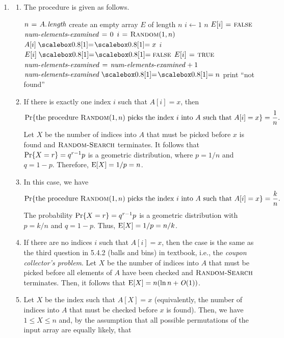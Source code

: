\begin{enumerate}[\thechapter-1]
\begin{enumerate}[\it a.]
\end{enumerate}
%
\item
\begin{enumerate}[\it a.]
\item The procedure is given as follows.
\begin{codebox}
\li $n \gets \attrib{A}{length}$
\li create an empty array $E$ of length $n$
\li \For $i \gets 1$ \To $n$
\li \Do
        $E[i] \mathrel{\hspace{1pt}=\hspace{1pt}} \textnormal{\scshape false}$
    \End
\li $\id{num-elements-examined} \gets 0$
\li \Repeat
\li      $i \mathrel{\hspace{1pt}=\hspace{1pt}} \textnormal{\scshape Random}(1, n)$
\li      \If $A[i] \isequal x$
\li          \Then
                   \Return $i$
\li          \Else
                   \If $E[i] \isequal \const{false}$
\li                    \Then
                             $E[i] \mathrel{\hspace{1pt}=\hspace{1pt}} \textnormal{\scshape true}$
\li                          $\id{num-elements-examined} \gets \id{num-elements-examined} + 1$
                       \End
             \End
\li \Until $\id{num-elements-examined} \isequal n$
\li print ``not found''
\end{codebox}
\item If there is exactly one index $i$ such that $A[i] = x$, then
\[
\pr{\mathtext{the procedure \mathmode{\proc{Random}(1, n)} picks the index \mathmode{i} into \mathmode{A} such that \mathmode{A[i] = x}}} = \frac{1}{n}.
\]
Let $X$ be the number of indices into $A$ that must be picked before $x$ is found and $\textnormal{\scshape Random-Search}$ terminates. It follows that $\Pr\!\left\{X = r\right\} = q^{r - 1}p$ is a geometric distribution, where $p = 1/n$ and $q = 1 - p$. Therefore, $\mathrm{E}\!\left[X\right] = 1/p = n$.
\item In this case, we have
\[
\pr{\mathtext{the procedure \mathmode{\proc{Random}(1, n)} picks the index \mathmode{i} into \mathmode{A} such that \mathmode{A[i] = x}}} = \frac{k}{n}.
\]
The probability $\Pr\!\left\{X = r\right\} = q^{r - 1}p$ is a geometric distribution with $p = k/n$ and $q = 1 - p$. Thus, $\mathrm{E}\!\left[X\right] = 1/p = n/k$.
\item If there are no indices $i$ such that $A[i] = x$, then the case is the same as the third question in 5.4.2 (balls and bins) in textbook, i.e., the \emph{coupon collector's problem}. Let $X$ be the number of indices into $A$ that must be picked before all elements of $A$ have been checked and $\textnormal{\scshape Random-Search}$ terminates. Then, it follows that $\mathrm{E}\!\left[X\right] = n(\ln n + \mathit{O}\!\left(1\right))$.
\item Let $X$ be the index such that $A[X] = x$ (equivalently, the number of indices into $A$ that must be checked before $x$ is found). Then, we have $1 \leq X \leq n$ and, by the assumption that all possible permutations of the input array are equally likely, that

\end{enumerate}
\end{enumerate}
